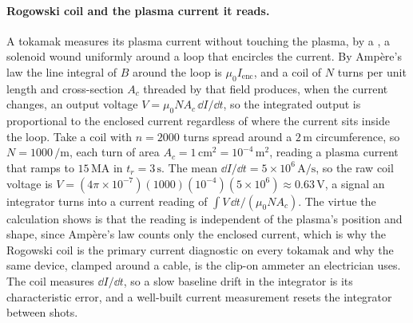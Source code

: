 \paragraph{Rogowski coil and the plasma current it reads.}
A tokamak measures its plasma current without touching the plasma, by a
, a solenoid wound uniformly around a loop that encircles
the current. By Amp\`ere's law the line integral of $B$ around the loop is
$\mu_0 I_{\mathrm{enc}}$, and a coil of $N$ turns per unit length and
cross-section $A_c$ threaded by that field produces, when the current changes,
an output voltage $V = \mu_0 N A_c\,\dd I/\dd t$, so the integrated output is
proportional to the enclosed current regardless of where the current sits
inside the loop. Take a coil with $n = 2000$ turns spread around a $2\,\si{
\meter}$ circumference, so $N = 1000\,\si{\per\meter}$, each turn of area $A_c
= 1\,\si{\centi\meter\squared} = 10^{-4}\,\si{\meter\squared}$, reading a
plasma current that ramps to $15\,\si{\mega\ampere}$ in $t_r = 3\,\si{\second}$.
The mean $\dd I/\dd t = 5\times 10^{6}\,\si{\ampere\per\second}$, so the raw
coil voltage is $V = (4\pi\times 10^{-7})(1000)(10^{-4})(5\times 10^{6})
\approx 0.63\,\si{\volt}$, a signal an integrator turns into a current reading
of $\int V\,\dd t/(\mu_0 N A_c)$. The virtue the calculation shows is that the
reading is independent of the plasma's position and shape, since Amp\`ere's law
counts only the enclosed current, which is why the Rogowski coil is the primary
current diagnostic on every tokamak and why the same device, clamped around a
cable, is the clip-on ammeter an electrician uses. The coil measures $\dd I/\dd
t$, so a slow baseline drift in the integrator is its characteristic error, and
a well-built current measurement resets the integrator between shots.

